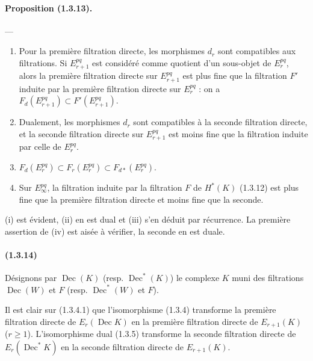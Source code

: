 \documentclass[10pt]{article}
\newcommand{\Dec}{\operatorname{Dec}}
\begin{document}
\paragraph{Proposition (1.3.13).} ---
\begin{enumerate}[label=(\roman*)]
\item Pour la première filtration directe, les morphismes $d_r$ sont compatibles aux filtrations. Si $E_{r+1}^{pq}$ est considéré comme quotient d'un sous-objet de $E_r^{pq}$, alors la première filtration directe sur $E_{r+1}^{pq}$ est plus fine que la filtration $F'$ induite par la première filtration directe sur $E_r^{pq}$ : on a $F_d(E_{r+1}^{pq})\subset F'(E_{r+1}^{pq})$.
\item Dualement, les morphismes $d_r$ sont compatibles à la seconde filtration directe, et la seconde filtration directe sur $E_{r+1}^{pq}$ est moins fine que la filtration induite par celle de $E_r^{pq}$.
\item $F_d(E_r^{pq})\subset F_r(E_r^{pq})\subset F_{d*}(E_r^{pq})$.
\item Sur $E_\infty^{pq}$, la filtration induite par la filtration $F$ de $H^*(K)$ (1.3.12) est plus fine que la première filtration directe et moins fine que la seconde.
\end{enumerate}
(i) est évident, (ii) en est dual et (iii) s'en déduit par récurrence. La première assertion de (iv) est aisée à vérifier, la seconde en est duale.

\paragraph{(1.3.14)} Désignons par $\Dec(K)$ (resp. $\Dec^*(K)$) le complexe $K$ muni des filtrations $\Dec(W)$ et $F$ (resp. $\Dec^*(W)$ et $F$).

Il est clair sur (1.3.4.1) que l'isomorphisme (1.3.4) transforme la première filtration directe de $E_r(\Dec K)$ en la première filtration directe de $E_{r+1}(K)$ ($r\ge1$). L'isomorphisme dual (1.3.5) transforme la seconde filtration directe de $E_r(\Dec^*K)$ en la seconde filtration directe de $E_{r+1}(K)$.
\end{document}
